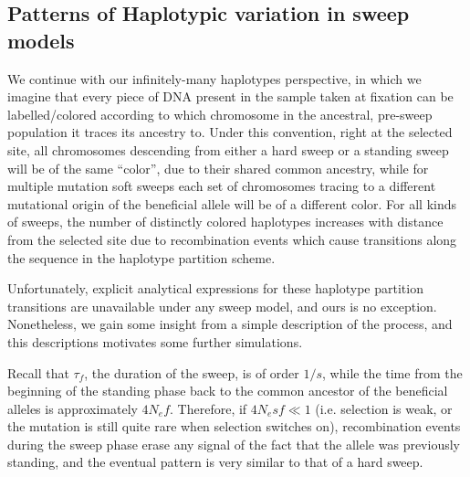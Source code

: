 \documentclass[a4paper,10pt]{article}
\newcommand{\jb}[1]{{\it\color{blue} (#1)} }
\begin{document}
\subsection{Patterns of Haplotypic variation in sweep models}

%

We continue with our infinitely-many haplotypes perspective, in which we imagine that every piece of DNA present in the sample taken at fixation can be labelled/colored according to which chromosome in the ancestral, pre-sweep population it traces its ancestry to. Under this convention, right at the selected site, all chromosomes descending from either a hard sweep or a standing sweep will be of the same ``color'', due to their shared common ancestry, while for multiple mutation soft sweeps each set of chromosomes tracing to a different mutational origin of the beneficial allele will be of a different color. For all kinds of sweeps, the number of distinctly colored haplotypes increases with distance from the selected site due to recombination events which cause transitions along the sequence in the haplotype partition scheme.

Unfortunately, explicit analytical expressions for these haplotype partition transitions are unavailable under any sweep model, and ours is no exception. Nonetheless, we gain some insight from a simple description of the process, and this descriptions motivates some further simulations.

Recall that $\tau_{f}$, the duration of the sweep, is of order $1/s$, while the time from the beginning of the standing phase back to the common ancestor of the beneficial alleles is approximately $4N_e f$. Therefore, if $4N_e s f \ll 1$ (i.e. selection is weak, or the mutation is still quite rare when selection switches on), recombination events during the sweep phase erase any signal of the fact that the allele was previously standing, and the eventual pattern is very similar to that of a hard sweep.
\end{document}

